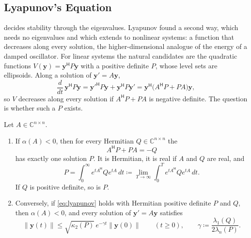 \subsection{Lyapunov's Equation}

 decides stability through the eigenvalues. Lyapunov found a second way, which needs no eigenvalues and which extends to nonlinear systems: a function that decreases along every solution, the higher-dimensional analogue of the energy of a damped oscillator. For linear systems the natural candidates are the quadratic functions $V(\mathbf y)=\mathbf y^{\mathsf H}P\mathbf y$ with a positive definite $P$, whose level sets are ellipsoids. Along a solution of $\mathbf y'=A\mathbf y$,
\[
\frac d{dt}\,\mathbf y^{\mathsf H}P\mathbf y=\mathbf y'^{\mathsf H}P\mathbf y+\mathbf y^{\mathsf H}P\mathbf y'=\mathbf y^{\mathsf H}\bigl(A^{\mathsf H}P+PA\bigr)\mathbf y ,
\]
so $V$ decreases along every solution if $A^{\mathsf H}P+PA$ is negative definite. The question is whether such a $P$ exists.

\begin{theorem}
\label{thm:lyapunov-equation}
Let $A\in\mathbb C^{n\times n}$.
\begin{enumerate}
\item If $\alpha(A)<0$, then for every Hermitian $Q\in\mathbb C^{n\times n}$ the 
\begin{equation}
A^{\mathsf H}P+PA=-Q
\label{eq:lyapunov}
\end{equation}
has exactly one solution $P$. It is Hermitian, it is real if $A$ and $Q$ are real, and
\[
P=\int_0^\infty e^{tA^{\mathsf H}}Qe^{tA}\,dt\coloneqq\lim_{T\to\infty}\int_0^Te^{tA^{\mathsf H}}Qe^{tA}\,dt .
\]
If $Q$ is positive definite, so is $P$.
\item Conversely, if \eqref{eq:lyapunov} holds with Hermitian positive definite $P$ and $Q$, then $\alpha(A)<0$, and every solution of $\mathbf y'=A\mathbf y$ satisfies
\[
\|\mathbf y(t)\|\le\sqrt{\kappa_2(P)}\,e^{-\gamma t}\|\mathbf y(0)\|\qquad(t\ge0),\qquad\gamma\coloneqq\frac{\lambda_1(Q)}{2\lambda_n(P)} .
\]
\end{enumerate}
\end{theorem}

